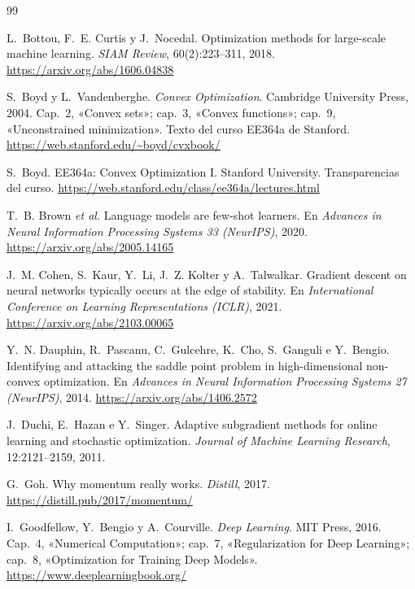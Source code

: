 \begin{thebibliography}{99}
\small
\def\UrlBreaks{\do\/\do-}

L.~Bottou, F.~E. Curtis y J.~Nocedal.
\newblock Optimization methods for large-scale machine learning.
\newblock \emph{SIAM Review}, 60(2):223--311, 2018.
\newblock \url{https://arxiv.org/abs/1606.04838}

S.~Boyd y L.~Vandenberghe.
\newblock \emph{Convex Optimization}.
\newblock Cambridge University Press, 2004.
\newblock Cap.~2, «Convex sets»; cap.~3, «Convex functions»; cap.~9, «Unconstrained minimization». Texto del curso EE364a de Stanford.
\newblock \url{https://web.stanford.edu/~boyd/cvxbook/}

S.~Boyd.
\newblock EE364a: Convex Optimization I.
\newblock Stanford University. Transparencias del curso.
\newblock \url{https://web.stanford.edu/class/ee364a/lectures.html}

T.~B. Brown \emph{et al.}
\newblock Language models are few-shot learners.
\newblock En \emph{Advances in Neural Information Processing Systems 33 (NeurIPS)}, 2020.
\newblock \url{https://arxiv.org/abs/2005.14165}

J.~M. Cohen, S.~Kaur, Y.~Li, J.~Z. Kolter y A.~Talwalkar.
\newblock Gradient descent on neural networks typically occurs at the edge of stability.
\newblock En \emph{International Conference on Learning Representations (ICLR)}, 2021.
\newblock \url{https://arxiv.org/abs/2103.00065}

Y.~N. Dauphin, R.~Pascanu, C.~Gulcehre, K.~Cho, S.~Ganguli e Y.~Bengio.
\newblock Identifying and attacking the saddle point problem in high-dimensional non-convex optimization.
\newblock En \emph{Advances in Neural Information Processing Systems 27 (NeurIPS)}, 2014.
\newblock \url{https://arxiv.org/abs/1406.2572}

J.~Duchi, E.~Hazan e Y.~Singer.
\newblock Adaptive subgradient methods for online learning and stochastic optimization.
\newblock \emph{Journal of Machine Learning Research}, 12:2121--2159, 2011.

G.~Goh.
\newblock Why momentum really works.
\newblock \emph{Distill}, 2017.
\newblock \url{https://distill.pub/2017/momentum/}

I.~Goodfellow, Y.~Bengio y A.~Courville.
\newblock \emph{Deep Learning}.
\newblock MIT Press, 2016.
\newblock Cap.~4, «Numerical Computation»; cap.~7, «Regularization for Deep Learning»; cap.~8, «Optimization for Training Deep Models».
\newblock \url{https://www.deeplearningbook.org/}


\end{thebibliography}
